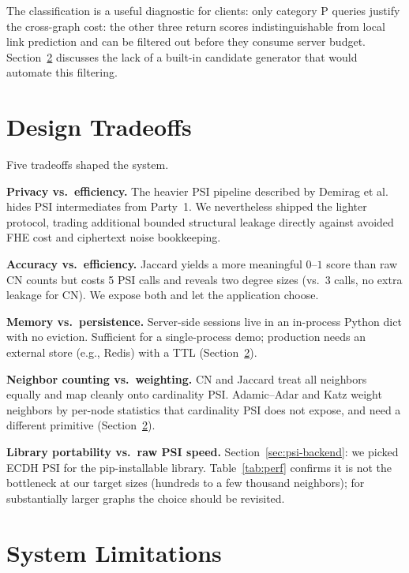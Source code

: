 \documentclass[sigconf]{acmart}
\begin{document}
The classification is a useful diagnostic for clients: only category P queries justify the cross-graph cost: the other three return scores indistinguishable from local link prediction and can be filtered out before they consume server budget. Section~\ref{sec:limitations} discusses the lack of a built-in candidate generator that would automate this filtering.

\section{Design Tradeoffs}

Five tradeoffs shaped the system.

\textbf{Privacy vs.\ efficiency.}
The heavier PSI pipeline described by Demirag et al.~\cite{Demirag2022} hides PSI intermediates from Party~1. We nevertheless shipped the lighter protocol, trading additional bounded structural leakage directly against avoided FHE cost and ciphertext noise bookkeeping.

\textbf{Accuracy vs.\ efficiency.} Jaccard yields a more meaningful $0$--$1$ score than raw CN counts but costs 5 PSI calls and reveals two degree sizes (vs.\ 3 calls, no extra leakage for CN). We expose both and let the application choose.

\textbf{Memory vs.\ persistence.} Server-side sessions live in an in-process Python dict with no eviction. Sufficient for a single-process demo; production needs an external store (e.g., Redis) with a TTL (Section~\ref{sec:limitations}).

\textbf{Neighbor counting vs.\ weighting.} CN and Jaccard treat all neighbors equally and map cleanly onto cardinality PSI. Adamic--Adar and Katz weight neighbors by per-node statistics that cardinality PSI does not expose, and need a different primitive (Section~\ref{sec:limitations}).

\textbf{Library portability vs.\ raw PSI speed.} Section~\ref{sec:psi-backend}: we picked ECDH PSI for the pip-installable library. Table~\ref{tab:perf} confirms it is not the bottleneck at our target sizes (hundreds to a few thousand neighbors); for substantially larger graphs the choice should be revisited.

\section{System Limitations}
\label{sec:limitations}
\end{document}
